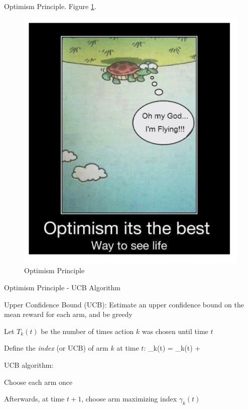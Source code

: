 \documentclass[english]{article}
\begin{document}
\item {Optimism Principle}. Figure \ref{opti}.
\begin{figure}[h!]
\begin{center}
\includegraphics[width=0.25\paperwidth]{opti}
    \caption{Optimism Principle}
    \label{opti}
\end{center}
\end{figure}




\item {Optimism Principle - UCB Algorithm}
\bitem 
\item Upper Confidence Bound (UCB): Estimate an upper confidence bound on the mean reward for each arm, and be greedy
\item Let $T_k(t)$ be the number of times action $k$ was chosen until time $t$
\item Define the \emph{index} (or UCB) of arm $k$ at time $t$:
\beqs
\gamma_{k}(t)  = \hmu_k(t) + 
\eeqs
\item UCB algorithm:
\benum
\item Choose each arm once
\item Afterwards, at time $t+1$, choose arm maximizing index $\gamma_{k}(t)$
\eenum
\eitem
\end{document}
